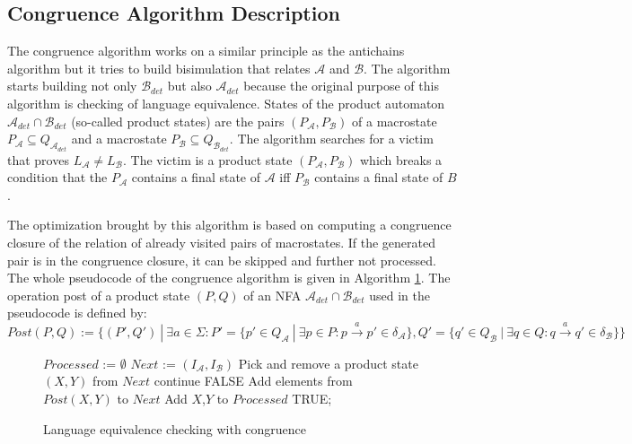  \subsection{Congruence Algorithm Description}
\label{subsectCongr}
The congruence algorithm works on a similar principle as the antichains algorithm but  %
it tries to build bisimulation that relates $\mathcal{A}$ and $\mathcal{B}$. The algorithm starts building not only $\mathcal{B}_{det}$ 
but also $\mathcal{A}_{det}$ because the original purpose of this algorithm is checking of 
language equivalence. States of the product automaton $\mathcal{A}_{det} \cap \mathcal{B}_{det}$  (so-called product states) are the pairs 
$(P_\mathcal{A},P_\mathcal{B})$ of a macrostate $P_\mathcal{A} \subseteq Q_{\mathcal{A}_{det}}$ and a macrostate
$P_\mathcal{B} \subseteq Q_{\mathcal{B}_{det}}$. 
The algorithm searches for a victim that proves $L_\mathcal{A} \neq L_\mathcal{B}$. The victim is a product state $(P_\mathcal{A},P_\mathcal{B})$ 
which breaks a condition that
the $P_\mathcal{A}$ contains a final state of $\mathcal{A}$ iff $P_\mathcal{B}$ contains a final state of $B$. 

The optimization brought by this algorithm is based on computing a congruence closure of the relation of already visited pairs of macrostates. 
If the generated pair is in the congruence closure, it can be skipped and further not processed.
The whole pseudocode of the congruence algorithm is given in Algorithm \ref{algCongr}. The operation post of a product state $(P,Q)$ of an 
NFA $\mathcal{A}_{det}\cap \mathcal{B}_{det}$ used in the pseudocode is defined by:\
$Post(P,Q):=\{(P',Q')\ |\ \exists a \in \Sigma: P'=
\{p'\in Q_{\mathcal{A}}\ |\ \exists p \in P:p\xrightarrow{a} p'\in \delta_\mathcal{A}\}, Q'=
\{q'\in Q_{\mathcal{B}}\ |\ \exists q \in Q:q\xrightarrow{a} q'\in \delta_\mathcal{B}\}\}$


\begin{figure}[ht]
	\begin{algorithm}[H]
		\label{algCongr}
		\KwOut{TRUE, if $L_\mathcal{A}=L_\mathcal{B}$. Otherwise FALSE.}
			$Processed$ := $\emptyset$\;
			$Next$ := $(I_\mathcal{A},I_\mathcal{B})$\;
			{
				Pick and remove a product state $(X,Y)$ from $Next$\;
				{continue\;}
				{
					\Return FALSE\;
				}
					Add elements from $Post(X,Y)$ to $Next$\;
				Add $X$,$Y$ to $Processed$\;
			}
			\Return TRUE;
		\caption{Language equivalence checking with congruence}
\end{algorithm}
\end{figure}


